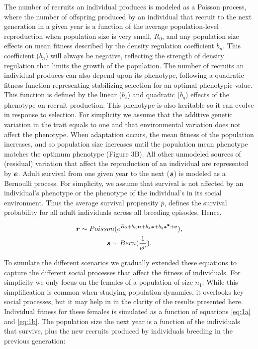 \documentclass{article}
\begin{document}
The number of recruits an individual produces is modeled as a Poisson process, where the number of offspring produced by an individual that recruit to the next generation in a given year is a function of the average population-level reproduction when population size is very small, $R_0$, and any population size effects on mean fitness described by the density regulation coefficient $b_{n}$. This coefficient ($b_{n}$) will always be negative, reflecting the strength of density regulation that limits the growth of the population.  The number of recruits an individual produces can also depend upon its phenotype, following a quadratic fitness function representing stabilizing selection for an optimal phenotypic value. This function is defined by the linear ($b_z$) and quadratic ($b_q$) effects of the phenotype on recruit production. This phenotype is also heritable so it can evolve in response to selection. For simplicity we assume that the additive genetic variation in the trait equals to one and that environmental variation does not affect the phenotype. When adaptation occurs, the mean fitness of the population increases, and so population size increases until the population mean phenotype matches the optimum phenotype (Figure 3B). All other unmodeled sources of (residual) variation that affect the reproduction of an individual are represented by $\vectorsym{e}$. Adult survival from one given year to the next ($\vectorsym{s}$) is modeled as a Bernoulli process. For simplicity, we assume that survival is not affected by an individual's phenotype or the phenotype of the individual's in its social environment. Thus the average survival propensity $\bar{p}$, defines the survival probability for all adult individuals across all breeding episodes. Hence,

\begin{subequations} 
\begin{gather}
\vectorsym{r}\sim Poisson(e^{R_{0} + b_{n} \vectorsym{n} + b_{z} \vectorsym{z} + b_{q} \vectorsym{z^2} + \vectorsym{e}}), \label{eq:1a} \\
\vectorsym{s}\sim Bern(\frac{1}{e^{\bar{p}}}). \label{eq:1b}
\end{gather}
\end{subequations}

To simulate the different scenarios we gradually extended these equations to capture the different social processes that affect the fitness of individuals. For simplicity we only focus on the females of a population of size $n_{1}$. While this simplification is common when studying population dynamics, it overlooks key social processes, but it may help in in the clarity of the results presented here. Individual fitness for these females is simulated as a function of equations \ref{eq:1a} and \ref{eq:1b}. The population size the next year is a function of the individuals that survive, plus the new recruits produced by individuals breeding in the previous generation:
\end{document}
